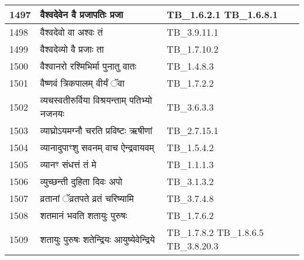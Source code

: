 \documentclass[17pt]{extarticle}
\begin{document}
\begin{longtable}{||p{0.4in}||p{4.9in}||p{0.9in}||}
    \hline
        
    1497 & वैश्वदेवेन वै प्रजापतिः प्रजा & TB\_1.6.2.1 TB\_1.6.8.1       \\
    
    \hline
        
    1498 & वैश्वदेवो वा अश्वः तं & TB\_3.9.11.1       \\
    
    \hline
        
    1499 & वैश्वदेव्यो वै प्रजाः ता & TB\_1.7.10.2       \\
    
    \hline
        
    1500 & वैश्वानरो रश्मिभिर्मा पुनातु वातः & TB\_1.4.8.3       \\
    
    \hline
        
    1501 & वैष्णवं त्रिकपालम् वीर्यं ॅवा & TB\_1.7.2.2       \\
    
    \hline
        
    1502 & व्यचस्वतीरुर्विया विश्रयन्ताम् पतिभ्यो नजनयः & TB\_3.6.3.3       \\
    
    \hline
        
    1503 & व्याघ्रोऽयमग्नौ चरति प्रविष्टः ऋषीणां & TB\_2.7.15.1       \\
    
    \hline
        
    1504 & व्यानादुपाꣳशु सवनम् वाच ऐन्द्रवायवम् & TB\_1.5.4.2       \\
    
    \hline
        
    1505 & व्यानꣳ संधत्तं तं मे & TB\_1.1.1.3       \\
    
    \hline
        
    1506 & व्युच्छन्ती दुहिता दिवः अपो & TB\_3.1.3.2       \\
    
    \hline
        
    1507 & व्रतानां ॅव्रतपते व्रतं चरिष्यामि & TB\_3.7.4.8       \\
    
    \hline
        
    1508 & शतमानं भवति शतायुः पुरुषः & TB\_1.7.6.2       \\
    
    \hline
        
    1509 & शतायुः पुरुषः शतेन्द्रियः आयुष्येवेन्द्रिये & TB\_1.7.8.2 TB\_1.8.6.5 TB\_3.8.20.3       \\
    

\end{longtable}
\end{document}
